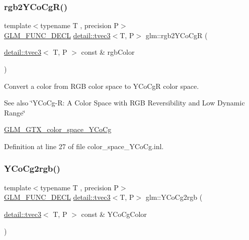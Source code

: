 \subsubsection{\texorpdfstring{rgb2\+Y\+Co\+Cg\+R()}{rgb2YCoCgR()}}
{\footnotesize\ttfamily template$<$typename T , precision P$>$ \\
\hyperlink{setup_8hpp_ab2d052de21a70539923e9bcbf6e83a51}{G\+L\+M\+\_\+\+F\+U\+N\+C\+\_\+\+D\+E\+CL} \hyperlink{structglm_1_1detail_1_1tvec3}{detail\+::tvec3}$<$T, P$>$ glm\+::rgb2\+Y\+Co\+CgR (\begin{DoxyParamCaption}\item[{\hyperlink{structglm_1_1detail_1_1tvec3}{detail\+::tvec3}$<$ T, P $>$ const \&}]{rgb\+Color }\end{DoxyParamCaption})}

Convert a color from R\+GB color space to Y\+Co\+CgR color space. \begin{DoxySeeAlso}{See also}
\char`\"{}\+Y\+Co\+Cg-\/\+R\+: A Color Space with R\+G\+B Reversibility and Low Dynamic Range\char`\"{} 

\hyperlink{group__gtx__color__space___y_co_cg}{G\+L\+M\+\_\+\+G\+T\+X\+\_\+color\+\_\+space\+\_\+\+Y\+Co\+Cg} 
\end{DoxySeeAlso}


Definition at line 27 of file color\+\_\+space\+\_\+\+Y\+Co\+Cg.\+inl.

\mbox{\label{group__gtx__color__space___y_co_cg_gab40e31e352d2d318d3f062df2882c500}} 
\subsubsection{\texorpdfstring{Y\+Co\+Cg2rgb()}{YCoCg2rgb()}}
{\footnotesize\ttfamily template$<$typename T , precision P$>$ \\
\hyperlink{setup_8hpp_ab2d052de21a70539923e9bcbf6e83a51}{G\+L\+M\+\_\+\+F\+U\+N\+C\+\_\+\+D\+E\+CL} \hyperlink{structglm_1_1detail_1_1tvec3}{detail\+::tvec3}$<$T, P$>$ glm\+::\+Y\+Co\+Cg2rgb (\begin{DoxyParamCaption}\item[{\hyperlink{structglm_1_1detail_1_1tvec3}{detail\+::tvec3}$<$ T, P $>$ const \&}]{Y\+Co\+Cg\+Color }\end{DoxyParamCaption})}

